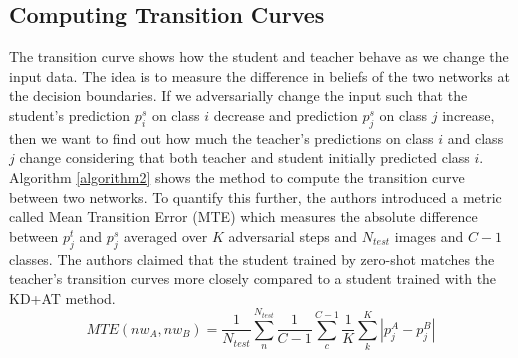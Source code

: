 \documentclass{article}
\begin{document}
\subsection{Computing Transition Curves}
The transition curve shows how the student and teacher behave as we change the input data. The idea is to measure the difference in beliefs of the two networks at the decision boundaries. If we adversarially change the input such that the student's prediction $p_i^s$ on class $i$ decrease and prediction $p_j^s$ on class $j$ increase, then we want to find out how much the teacher's predictions on class $i$ and class $j$ change considering that both teacher and student initially predicted class $i$. Algorithm \ref{algorithm2} shows the method to compute the transition curve between two networks. To quantify this further, the authors introduced a metric called Mean Transition Error (MTE) which measures the absolute difference between $p_j^t$ and $p_j^s$ averaged over $K$ adversarial steps and $N_{test}$ images and $C-1$ classes. The authors claimed that the student trained by zero-shot matches the teacher's transition curves more closely compared to a student trained with the KD+AT method.
\begin{equation}
    MTE(nw_A,nw_B)=\frac{1}{N_{test}}\sum^{N_{test}}_{n}{\frac{1}{C-1}}\sum^{C-1}_{c}{\frac{1}{K}}\sum^{K}_{k}{\left|p_j^A-p_j^B\right|}
\end{equation}
\end{document}
